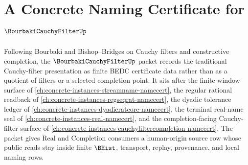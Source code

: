 \chapter{A Concrete Naming Certificate for $\BourbakiCauchyFilterUp$}
\label{ch:concrete-instances-bourbaki-cauchy-filter-namecert}

Following Bourbaki and Bishop--Bridges on Cauchy filters and constructive completion, the $\BourbakiCauchyFilterUp$ packet records the traditional Cauchy-filter presentation as finite BEDC certificate data rather than as a quotient of filters or a selected completion point. It sits after the finite window surface of \autoref{ch:concrete-instances-streamname-namecert}, the regular rational readback of \autoref{ch:concrete-instances-regseqrat-namecert}, the dyadic tolerance ledger of \autoref{ch:concrete-instances-dyadicratcore-namecert}, the terminal real-name seal of \autoref{ch:concrete-instances-real-namecert}, and the completion-facing Cauchy-filter surface of \autoref{ch:concrete-instances-cauchyfiltercompletion-namecert}. The packet gives Real and Completion consumers a human-origin source row whose public reads stay inside finite $\BHist$, transport, replay, provenance, and local naming rows.

